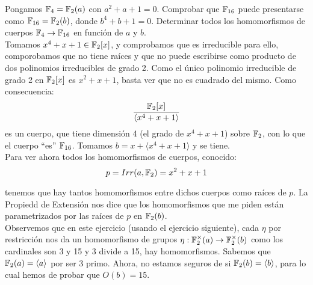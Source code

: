 \begin{ejercicio}
    Pongamos $\mathbb{F}_4 = \mathbb{F}_2(a)$ con $a^2+a+1=0$. Comprobar que $\mathbb{F}_{16}$ puede presentarse como $\mathbb{F}_{16}=\mathbb{F}_2(b)$, donde $b^4+b+1=0$. Determinar todos los homomorfismos de cuerpos $\mathbb{F}_4\to \mathbb{F}_{16}$ en función de $a$ y $b$.\\

    \noindent
    Tomamos $x^4+x+1\in \mathbb{F}_2[x]$, y comprobamos que es irreducible para ello, comporobamos que no tiene raíces y que no puede escribirse como producto de dos polinomios irreducibles de grado 2. Como el único polinomio irreducible de grado 2 en $\mathbb{F}_2[x]$ es $x^2+x+1$, basta ver que no es cuadrado del mismo. Como consecuencia:
    \begin{equation*}
        \dfrac{\mathbb{F}_2[x]}{\langle x^4+x+1 \rangle }
    \end{equation*}
    es un cuerpo, que tiene dimensión 4 (el grado de $x^4+x+1$) sobre $\mathbb{F}_2$, con lo que el cuerpo ``es'' $\mathbb{F}_{16}$. Tomamos $b = x+\langle x^4+x+1 \rangle $ y se tiene.\\

    \noindent
    Para ver ahora todos los homomorfismos de cuerpos, conocido:
    \begin{equation*}
        p = Irr(a,\mathbb{F}_2) = x^2+x+1
    \end{equation*}
    \begin{figure}[H]
        \centering
    \end{figure}
    \noindent
    tenemos que hay tantos homomorfismos entre dichos cuerpos como raíces de $p$. La Propiedd de Extensión nos dice que los homomorfismos que me piden están parametrizados por las raíces de $p$ en $\mathbb{F}_2(b)$.\\

    \noindent
    Observemos que en este ejercicio (usando el ejercicio siguiente), cada $\eta$ por restricción nos da un homomorfismo de grupos $\eta:\mathbb{F}_2^\times(a)\to \mathbb{F}_2^\times(b)$ como los cardinales son 3 y 15 y 3 divide a 15, hay homomorfismos. Sabemos que $\mathbb{F}_2(a) = \langle a \rangle $ por ser 3 primo. Ahora, no estamos seguros de si $\mathbb{F}_2(b) = \langle b \rangle $, para lo cual hemos de probar que $O(b) = 15$.


\end{ejercicio}
